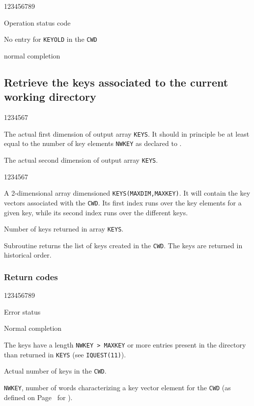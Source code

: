 \begin{DLtt}{123456789}
\item[IQUEST(1)]Operation status code
\begin{DLtt}{1}
\item[1]No entry for {\tt KEYOLD} in the {\tt CWD}
\item[0]normal completion
\end{DLtt}
\end{DLtt}

\subsection{Retrieve the keys associated to the current working directory}

\Idesc
\begin{DLtt}{1234567}
\item[MAXDIM]The actual first dimension of output array {\tt KEYS}.
It should in principle be at least equal to the number of key elements
{\tt NWKEY} as declared to .
\item[MAXKEY]The actual second dimension of output array {\tt KEYS}.
\end{DLtt}
\Odesc
\begin{DLtt}{1234567}
\item[KEYS*]A 2-dimensional array dimensioned {\tt KEYS(MAXDIM,MAXKEY)}.
It will contain the key vectors associated with the {\tt CWD}.
Its first index runs over the key elements for a given key, while
its second index runs over the different keys.
\item[NKEYS*]Number of keys returned in array {\tt KEYS}.
\end{DLtt}

Subroutine  returns the list of keys created in the
{\tt CWD}. The keys are returned in historical order.
\subsubsection*{Return codes}
\begin{DLtt}{123456789}
\item[IQUEST(1)]Error status
\begin{DLtt}{1}
\item[0]Normal completion
\item[1]The keys have a length {\tt NWKEY > MAXKEY}
or more entries present in the directory than returned in {\tt KEYS}
(see {\tt IQUEST(11)}).
\end{DLtt}
\par
\item[IQUEST(11)]Actual number of keys in the {\tt CWD}.
\item[IQUEST(12)]{\tt NWKEY}, number of words characterizing a key vector
element for the {\tt CWD} (as defined on Page~\pageref{RZMDIR} for ).
\end{DLtt}

